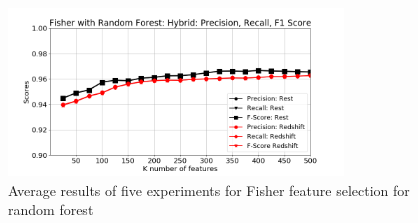 \documentclass[conference]{IEEEtran}
\begin{document}
	\begin{table}
\caption{10-Fold cross validation results for Fisher feature selection with hybrid sampling (367,004 samples) for redshifted spectra and artificial artificial rest spectra using Random Forest}
        \label{tab:fisher-H}
	\end{table}

        \begin{figure}
            \centering
            \includegraphics[width=3.5in]{Results3.png}
            \caption{Average results of five experiments for Fisher feature selection for random forest}
            \label{fig:results}
        \end{figure}
\end{document}
